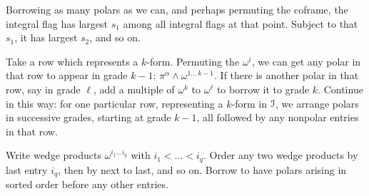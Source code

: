 Borrowing as many polars as we can, and perhaps permuting the coframe, the integral flag has largest \(s_1\) among all integral flags at that point.
Subject to that \(s_1\), it has largest \(s_2\), and so on.

Take a row which represents a \(k\)-form.
Permuting the \(\omega^i\), we can get any polar in that row to appear in grade \(k-1\): \(\pi^{\alpha}\wedge\omega^{1\dots \, k-1}\).
If there is another polar in that row, say in grade \(\ell\), add a multiple of \(\omega^k\) to \(\omega^{\ell}\) to borrow it to grade \(k\).
Continue in this way: for one particular row, representing a \(k\)-form in \(\mathcal{I}\), we arrange polars in successive grades, starting at grade \(k-1\), all followed by any nonpolar entries in that row.

Write wedge products \(\omega^{i_1\dots i_q}\) with \(i_1<\dots<i_q\).
Order any two wedge products by last entry \(i_q\), then by next to last, and so on.
Borrow to have polars arising in sorted order before any other entries.

